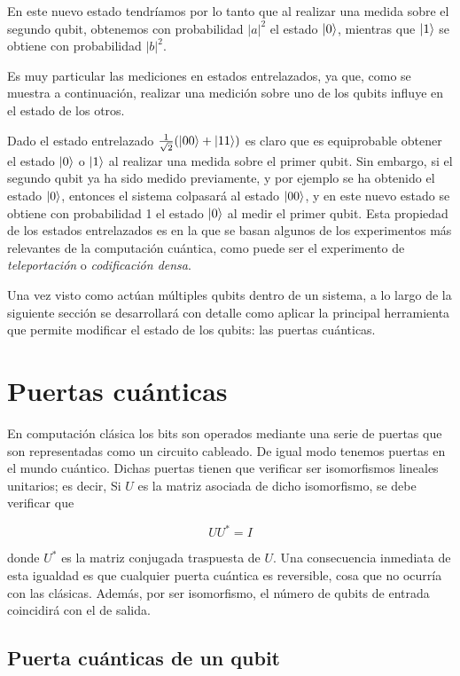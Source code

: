 En este nuevo estado tendríamos por lo tanto que al realizar una medida sobre el segundo qubit, obtenemos con probabilidad $|a|^2$ el estado $\left|0\right\rangle$, mientras que  $\left|1\right\rangle$ se obtiene con probabilidad $|b|^2$.

Es muy particular las mediciones en estados entrelazados, ya que, como se muestra a continuación, realizar una medición sobre uno de los qubits influye en el estado de los otros.

Dado el estado entrelazado $\tfrac{1}{\sqrt{2}}(\left|00\right\rangle + \left|11\right\rangle)$ es claro que es equiprobable obtener el estado $\left|0\right\rangle$ o $\left|1\right\rangle$ al realizar una medida sobre el primer qubit. Sin embargo, si el segundo qubit ya ha sido medido previamente, y por ejemplo se ha obtenido el estado $\left|0\right\rangle$, entonces el sistema colpasará al estado $\left|00\right\rangle$, y en este nuevo estado se obtiene con probabilidad 1 el estado $\left|0\right\rangle$ al medir el primer qubit. Esta propiedad de los estados entrelazados es en la que se basan algunos de los experimentos más relevantes de la computación cuántica, como puede ser el experimento de \textit{teleportación} o \textit{codificación densa}. 

Una vez visto como actúan múltiples qubits dentro de un sistema, a lo largo de la siguiente sección se desarrollará con detalle como aplicar la principal herramienta que permite modificar el estado de los qubits: las puertas cuánticas.

\section{Puertas cuánticas}

En computación clásica los bits son operados mediante una serie de puertas que son representadas como un circuito cableado. De igual modo tenemos puertas en el mundo cuántico. Dichas puertas tienen que verificar ser isomorfismos lineales unitarios; es decir, Si $U$ es la matriz asociada de dicho isomorfismo, se debe verificar que

\begin{equation}
UU^*=I
\end{equation}

donde $U^*$ es la matriz conjugada traspuesta de $U$. Una consecuencia inmediata de esta igualdad es que cualquier puerta cuántica es reversible, cosa que no ocurría con las clásicas. Además, por ser isomorfismo, el número de qubits de entrada coincidirá con el de salida.

\subsection{Puerta cuánticas de un qubit}

